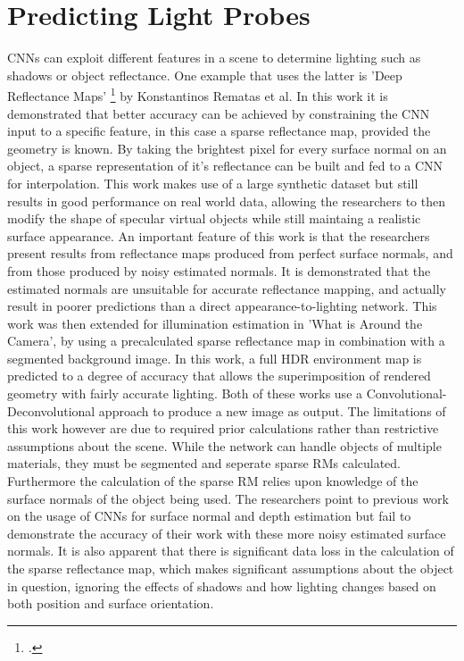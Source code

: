 \documentclass[ %
                    author={Gavin Parker},
                supervisor={Dr. Neill Campbell},
                    degree={MEng},
                     title={Deep Siamese Networks for Illumination Estimation from Stereo Images},
                  subtitle={},
                      type={research},
                      year={2018} ]{dissertation}
\begin{document}
\section{Predicting Light Probes}
CNNs can exploit different features in a scene to determine lighting such as shadows or object reflectance. One example that uses the latter is 'Deep Reflectance Maps' \footcite{https://arxiv.org/pdf/1511.04384.pdf} by Konstantinos Rematas et al. In this work it is demonstrated that better accuracy can be achieved by constraining the CNN input to a specific feature, in this case a sparse reflectance map, provided the geometry is known. By taking the brightest pixel for every surface normal on an object, a sparse representation of it's reflectance can be built and fed to a CNN for interpolation. This work makes use of a large synthetic dataset but still results in good performance on real world data, allowing the researchers to then modify the shape of specular virtual objects while still maintaing a realistic surface appearance. An important feature of this work is that the researchers present results from reflectance maps produced from perfect surface normals, and from those produced by noisy estimated normals. It is demonstrated that the estimated normals are unsuitable for accurate reflectance mapping, and actually result in poorer predictions than a direct appearance-to-lighting network.
\newline
This work was then extended for illumination estimation in 'What is Around the Camera', by using a precalculated sparse reflectance map in combination with a segmented background image. In this work, a full HDR environment map is predicted to a degree of accuracy that allows the superimposition of rendered geometry with fairly accurate lighting. Both of these works use a Convolutional-Deconvolutional approach to produce a new image as output. The limitations of this work however are due to required prior calculations rather than restrictive assumptions about the scene. While the network can handle objects of multiple materials, they must be segmented and seperate sparse RMs calculated. Furthermore the calculation of the sparse RM relies upon knowledge of the surface normals of the object being used. The researchers point to previous work  on the usage of CNNs for surface normal and depth estimation but fail to demonstrate the accuracy of their work with these more noisy estimated surface normals. It is also apparent that there is significant data loss in the calculation of the sparse reflectance map, which makes significant assumptions about the object in question, ignoring the effects of shadows and how lighting changes based on both position and surface orientation.
\end{document}

